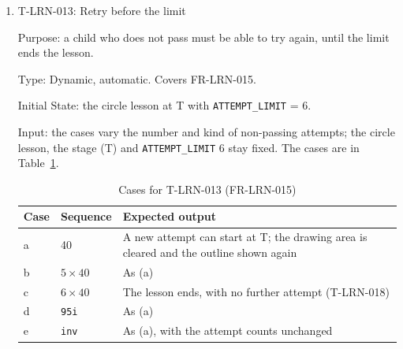 \documentclass[12pt, titlepage]{article}
\newcommand{\testitem}[1]{\item #1\par\nopagebreak}
\begin{document}
\begin{enumerate}
In every case, the text shown equals the catalogue's text for that lesson,
stage and category, and no request goes to an AI or model service during
the lesson.

Output: the expected output of each case is in its row of
Table~\ref{tab:t-lrn-012}; the test passes when every case gives it.

Test Case Derivation: the fit criterion asks for one prepared matching
drawing for each category, and for no free-generated advice. (a) to (d)
cover the three categories FR-LRN-014 names. (f) is the H-AHM-005 cause in
which ``the feedback lookup uses the wrong lesson or guidance stage''. (e)
checks that a good drawing gets no difficulty. SAF-MOU-001 (feedback does
not draw) is tested by T-SAF-014.

How test will be performed: Playwright reads the feedback text and compares
it with the catalogue file. The network log is checked for requests to the
refinement service or any model endpoint.

\testitem{T-LRN-013: Retry before the limit}

Purpose: a child who does not pass must be able to try again, until the
limit ends the lesson.

Type: Dynamic, automatic. Covers FR-LRN-015.

Initial State: the circle lesson at T with \texttt{ATTEMPT\_LIMIT} = 6.

Input: the cases vary the number and kind of non-passing attempts; the
circle lesson, the stage (T) and \texttt{ATTEMPT\_LIMIT} 6 stay fixed. The
cases are in Table~\ref{tab:t-lrn-013}.

\begin{table}[htbp]
\centering\small
\caption{Cases for T-LRN-013 (FR-LRN-015)}
\label{tab:t-lrn-013}
\begin{tabularx}{\textwidth}{@{}l l >{\raggedright\arraybackslash}X@{}}
\toprule
\textbf{Case} & \textbf{Sequence} & \textbf{Expected output}\\
\midrule
a & 40 & A new attempt can start at T; the drawing area is cleared and the
outline shown again\\
b & $5 \times 40$ & As (a)\\
c & $6 \times 40$ & The lesson ends, with no further attempt
(T-LRN-018)\\
d & \texttt{95i} & As (a)\\
e & \texttt{inv} & As (a), with the attempt counts unchanged\\
\bottomrule
\end{tabularx}
\end{table}


\end{enumerate}
\end{document}
